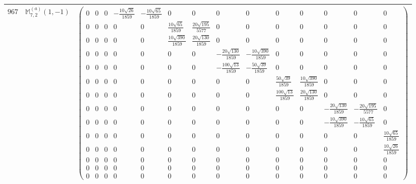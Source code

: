 \documentclass[fleqn,8pt,landscape]{jsarticle}
\begin{document}
\begin{center}
\begin{longtable}{ccc}
$ 967 $ & $ \mathbb{M}_{7,2}^{(a)}(1,-1) $ & $ \begin{pmatrix} 0 & 0 & 0 & - \frac{10 \sqrt{26}}{1859} & - \frac{10 \sqrt{65}}{1859} & 0 & 0 & 0 & 0 & 0 & 0 & 0 & 0 & 0 \\ 0 & 0 & 0 & 0 & 0 & \frac{10 \sqrt{65}}{1859} & \frac{20 \sqrt{195}}{5577} & 0 & 0 & 0 & 0 & 0 & 0 & 0 \\ 0 & 0 & 0 & 0 & 0 & \frac{10 \sqrt{390}}{1859} & \frac{20 \sqrt{130}}{1859} & 0 & 0 & 0 & 0 & 0 & 0 & 0 \\ 0 & 0 & 0 & 0 & 0 & 0 & 0 & - \frac{20 \sqrt{130}}{1859} & - \frac{10 \sqrt{390}}{1859} & 0 & 0 & 0 & 0 & 0 \\ 0 & 0 & 0 & 0 & 0 & 0 & 0 & - \frac{100 \sqrt{13}}{1859} & - \frac{50 \sqrt{39}}{1859} & 0 & 0 & 0 & 0 & 0 \\ 0 & 0 & 0 & 0 & 0 & 0 & 0 & 0 & 0 & \frac{50 \sqrt{39}}{1859} & \frac{10 \sqrt{390}}{1859} & 0 & 0 & 0 \\ 0 & 0 & 0 & 0 & 0 & 0 & 0 & 0 & 0 & \frac{100 \sqrt{13}}{1859} & \frac{20 \sqrt{130}}{1859} & 0 & 0 & 0 \\ 0 & 0 & 0 & 0 & 0 & 0 & 0 & 0 & 0 & 0 & 0 & - \frac{20 \sqrt{130}}{1859} & - \frac{20 \sqrt{195}}{5577} & 0 \\ 0 & 0 & 0 & 0 & 0 & 0 & 0 & 0 & 0 & 0 & 0 & - \frac{10 \sqrt{390}}{1859} & - \frac{10 \sqrt{65}}{1859} & 0 \\ 0 & 0 & 0 & 0 & 0 & 0 & 0 & 0 & 0 & 0 & 0 & 0 & 0 & \frac{10 \sqrt{65}}{1859} \\ 0 & 0 & 0 & 0 & 0 & 0 & 0 & 0 & 0 & 0 & 0 & 0 & 0 & \frac{10 \sqrt{26}}{1859} \\ 0 & 0 & 0 & 0 & 0 & 0 & 0 & 0 & 0 & 0 & 0 & 0 & 0 & 0 \\ 0 & 0 & 0 & 0 & 0 & 0 & 0 & 0 & 0 & 0 & 0 & 0 & 0 & 0 \\ 0 & 0 & 0 & 0 & 0 & 0 & 0 & 0 & 0 & 0 & 0 & 0 & 0 & 0 \end{pmatrix} $ \\ \hline

\end{longtable}
\end{center}
\end{document}
